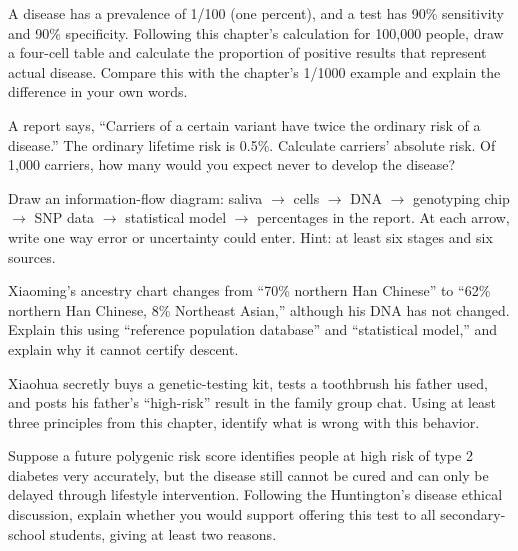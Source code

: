 \begin{sikaoti}
\item A disease has a prevalence of 1/100 (one percent), and a test has 90\% sensitivity and 90\% specificity. Following this chapter's calculation for 100,000 people, draw a four-cell table and calculate the proportion of positive results that represent actual disease. Compare this with the chapter's 1/1000 example and explain the difference in your own words.
\item A report says, ``Carriers of a certain variant have twice the ordinary risk of a disease.'' The ordinary lifetime risk is 0.5\%. Calculate carriers' absolute risk. Of 1,000 carriers, how many would you expect never to develop the disease?
\item Draw an information-flow diagram: saliva $\rightarrow$ cells $\rightarrow$ DNA $\rightarrow$ genotyping chip $\rightarrow$ SNP data $\rightarrow$ statistical model $\rightarrow$ percentages in the report. At each arrow, write one way error or uncertainty could enter. Hint: at least six stages and six sources.
\item Xiaoming's ancestry chart changes from ``70\% northern Han Chinese'' to ``62\% northern Han Chinese, 8\% Northeast Asian,'' although his DNA has not changed. Explain this using ``reference population database'' and ``statistical model,'' and explain why it cannot certify descent.
\item Xiaohua secretly buys a genetic-testing kit, tests a toothbrush his father used, and posts his father's ``high-risk'' result in the family group chat. Using at least three principles from this chapter, identify what is wrong with this behavior.
\item Suppose a future polygenic risk score identifies people at high risk of type 2 diabetes very accurately, but the disease still cannot be cured and can only be delayed through lifestyle intervention. Following the Huntington's disease ethical discussion, explain whether you would support offering this test to all secondary-school students, giving at least two reasons.
\end{sikaoti}

